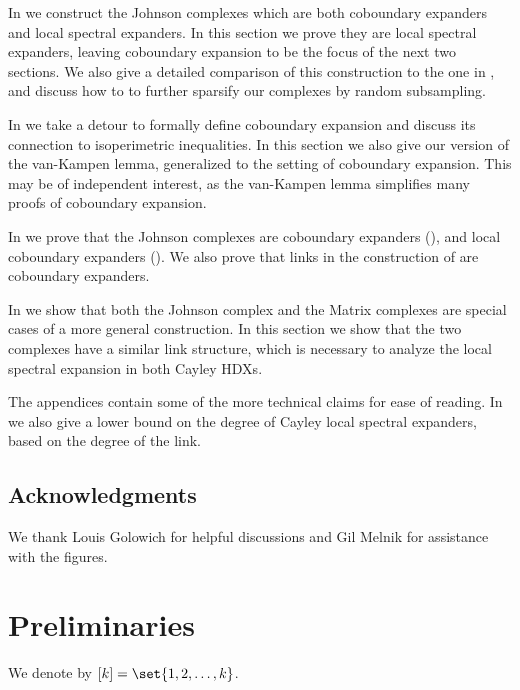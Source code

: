 In  we construct the Johnson complexes which are both coboundary expanders and local spectral expanders. In this section we prove they are local spectral expanders, leaving coboundary expansion to be the focus of the next two sections. We also give a detailed comparison of this construction to the one in \cite{LiuMSY2023}, and discuss how to to further sparsify our complexes by random subsampling.

In  we take a detour to formally define coboundary expansion and discuss its connection to isoperimetric inequalities. In this section we also give our version of the van-Kampen lemma, generalized to the setting of coboundary expansion. This may be of independent interest, as the van-Kampen lemma simplifies many proofs of coboundary expansion.

In  we prove that the Johnson complexes are coboundary expanders (), and local coboundary expanders (). We also prove that links in the construction of \cite{Golowich2023} are coboundary expanders.

In  we show that both the Johnson complex and the Matrix complexes are special cases of a more general construction. In this section we show that the two complexes have a similar link structure, which is necessary to analyze the local spectral expansion in both Cayley HDXs.

The appendices contain some of the more technical claims for ease of reading. In  we also give a lower bound on the degree of Cayley local spectral expanders, based on the degree of the link.

\subsection{Acknowledgments}
We thank Louis Golowich for helpful discussions and Gil Melnik for assistance with the figures.

\section{Preliminaries} \label{sec:prelims}
We denote by \([k]=\set{1,2,\dots,k}\). 

